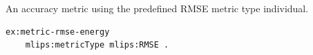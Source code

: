 An accuracy metric using the predefined RMSE metric type individual.
\begin{lstlisting}[language=turtle]
ex:metric-rmse-energy
    mlips:metricType mlips:RMSE .
\end{lstlisting}
